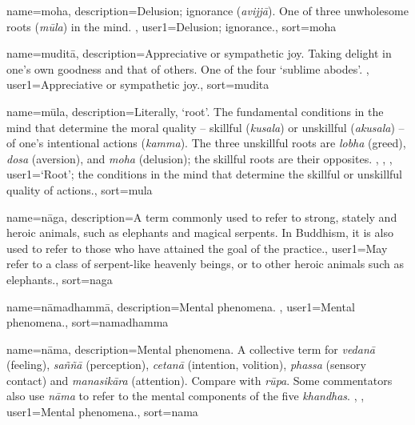 {
name={moha},
description={Delusion; ignorance (\textit{avijj\=a}). One of three unwholesome roots (\textit{m\=ula}) in the mind. \protect \seepre %
\protect {}%
\protect \seepost %
},
user1={Delusion; ignorance.},
sort={moha}
}

{
name={mudit\=a},
description={Appreciative or sympathetic joy. Taking delight in one's own goodness and that of others. One of the four `sublime abodes'. \protect \seepre %
\protect {}%
\protect \seepost %
},
user1={Appreciative or sympathetic joy.},
sort={mudita}
}

{
name={m\=ula},
description={Literally, `root'. The fundamental conditions in the mind that determine the moral quality -- skillful (\textit{kusala}) or unskillful (\textit{akusala}) -- of one's intentional actions (\textit{kamma}). The three unskillful roots are \textit{lobha} (greed), \textit{dosa} (aversion), and \textit{moha} (delusion); the skillful roots are their opposites. \protect \seepre %
\protect {}, \protect {}, \protect {}%
\protect \seepost %
},
user1={`Root'; the conditions in the mind that determine the skillful or unskillful quality of actions.},
sort={mula}
}

{
name={n\=aga},
description={A term commonly used to refer to strong, stately and heroic animals, such as elephants and magical serpents. In Buddhism, it is also used to refer to those who have attained the goal of the practice.},
user1={May refer to a class of serpent-like heavenly beings, or to other heroic animals such as elephants.},
sort={naga}
}

{
name=n\=amadhamm\=a,
description={Mental phenomena. \protect \seepre %
\protect {}%
\protect \seepost %
},
user1={Mental phenomena.},
sort={namadhamma}
}

{
name={n\=ama},
description={Mental phenomena. A collective term for \textit{vedan\=a} (feeling), \textit{sa\~n\~n\=a} (perception), \textit{cetan\=a} (intention, volition), \textit{phassa} (sensory contact) and \textit{manasik\=ara} (attention). Compare with \textit{r\=upa}. Some commentators also use \textit{n\=ama} to refer to the mental components of the five \textit{khandhas}. \protect \seepre %
\protect {}, \protect {}%
\protect \seepost %
},
user1={Mental phenomena.},
sort={nama}
}

